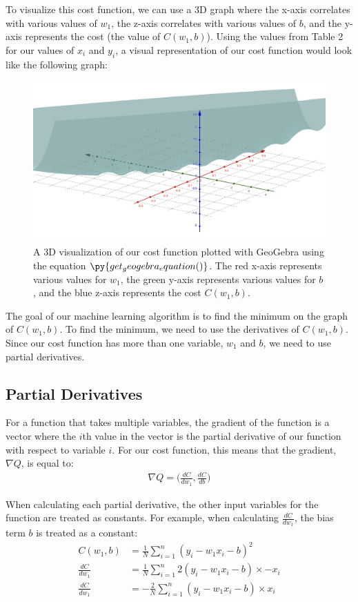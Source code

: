 \documentclass[12pt]{article}
\begin{document}
To visualize this cost function, we can use a 3D graph where the x-axis correlates with various values of $w_1$, the z-axis correlates with various values of $b$, and the y-axis represents the cost (the value of $C(w_1, b)$). Using the values from Table 2 for our values of $x_i$ and $y_i$, a visual representation of our cost function would look like the following graph:
\begin{figure}[H]
	\centering
	\caption{A 3D visualization of our cost function plotted with GeoGebra using the equation $\py{get_geogebra_equation()}$. The red x-axis represents various values for $w_1$, the green y-axis represents various values for $b$, and the blue z-axis represents the cost $C(w_1, b)$.}
	\includegraphics[width=\linewidth]{3d-plot.png}
\end{figure}

The goal of our machine learning algorithm is to find the minimum on the graph of $C(w_1, b)$. To find the minimum, we need to use the derivatives of $C(w_1, b)$. Since our cost function has more than one variable, $w_1$ and $b$, we need to use partial derivatives.

\subsection*{Partial Derivatives}

For a function that takes multiple variables, the gradient of the function is a vector where the $i$th value in the vector is the partial derivative of our function with respect to variable $i$. For our cost function, this means that the gradient, $\nabla Q$, is equal to:
\begin{align*}
	\nabla Q = \Big(\frac{dC}{dw_1}, \frac{dC}{db}\Big)
\end{align*}

When calculating each partial derivative, the other input variables for the function are treated as constants. For example, when calculating $\frac{dC}{dw_1}$, the bias term $b$ is treated as a constant:
\begin{align*}
	C(w_1, b)       & = \frac{1}{N} \sum_{i=1}^{n} (y_i - w_1x_i - b)^2
	\\
	\frac{dC}{dw_1} & = \frac{1}{N} \sum_{i=1}^{n} 2(y_i - w_1x_i - b) \times -x_i
	\\
	\frac{dC}{dw_1} & = -\frac{2}{N} \sum_{i=1}^{n} (y_i - w_1x_i - b) \times x_i
\end{align*}
\end{document}
